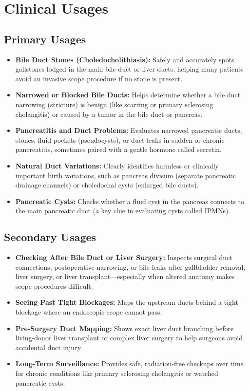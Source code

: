 \section{Clinical Usages}

\subsection{Primary Usages}
\begin{itemize}
\item \textbf{Bile Duct Stones (Choledocholithiasis):} Safely and accurately spots gallstones lodged in the main bile duct or liver ducts, helping many patients avoid an invasive scope procedure if no stone is present.
\item \textbf{Narrowed or Blocked Bile Ducts:} Helps determine whether a bile duct narrowing (stricture) is benign (like scarring or primary sclerosing cholangitis) or caused by a tumor in the bile duct or pancreas.
\item \textbf{Pancreatitis and Duct Problems:} Evaluates narrowed pancreatic ducts, stones, fluid pockets (pseudocysts), or duct leaks in sudden or chronic pancreatitis, sometimes paired with a gentle hormone called secretin.
\item \textbf{Natural Duct Variations:} Clearly identifies harmless or clinically important birth variations, such as pancreas divisum (separate pancreatic drainage channels) or choledochal cysts (enlarged bile ducts).
\item \textbf{Pancreatic Cysts:} Checks whether a fluid cyst in the pancreas connects to the main pancreatic duct (a key clue in evaluating cysts called IPMNs).
\end{itemize}

\subsection{Secondary Usages}
\begin{itemize}
\item \textbf{Checking After Bile Duct or Liver Surgery:} Inspects surgical duct connections, postoperative narrowing, or bile leaks after gallbladder removal, liver surgery, or liver transplant---especially when altered anatomy makes scope procedures difficult.
\item \textbf{Seeing Past Tight Blockages:} Maps the upstream ducts behind a tight blockage where an endoscopic scope cannot pass.
\item \textbf{Pre-Surgery Duct Mapping:} Shows exact liver duct branching before living-donor liver transplant or complex liver surgery to help surgeons avoid accidental duct injury.
\item \textbf{Long-Term Surveillance:} Provides safe, radiation-free checkups over time for chronic conditions like primary sclerosing cholangitis or watched pancreatic cysts.
\end{itemize}

